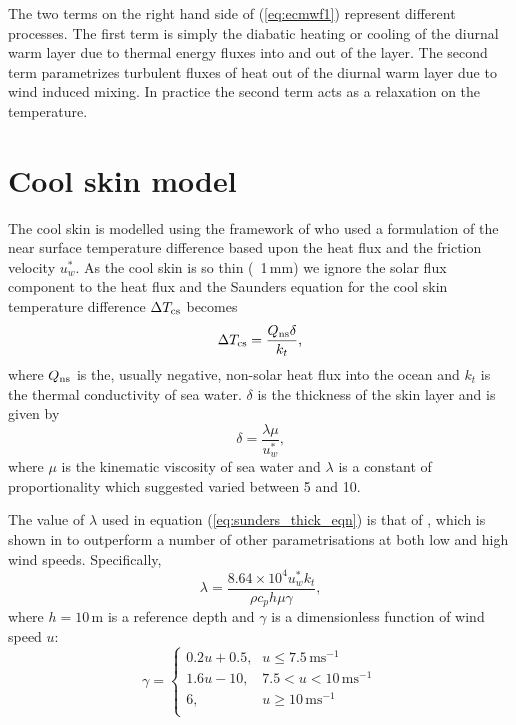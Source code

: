 \documentclass[../main/NEMO_manual]{subfiles}
\begin{document}
The two terms on the right hand side of (\autoref{eq:ecmwf1}) represent different processes.
The first term is simply the diabatic heating or cooling of the diurnal warm layer due to
thermal energy fluxes into and out of the layer.
The second term parametrizes turbulent fluxes of heat out of the diurnal warm layer due to wind induced mixing.
In practice the second term acts as a relaxation on the temperature.


\section{Cool skin model}
\label{sec:cool_skin_sec}


The cool skin is modelled using the framework of \citet{Saunders_JAS82} who used a formulation of the near surface temperature difference based upon the heat flux and the friction velocity $u^*_{w}$.
As the cool skin is so thin (~1\,mm) we ignore the solar flux component to the heat flux and the Saunders equation for the cool skin temperature difference $\Delta T_{\rm{cs}}$ becomes
\[
  \Delta T_{\rm{cs}}=\frac{Q_{\rm{ns}}\delta}{k_t} \mbox{,}
\]
where $Q_{\rm{ns}}$ is the, usually negative, non-solar heat flux into the ocean and
$k_t$ is the thermal conductivity of sea water.
$\delta$ is the thickness of the skin layer and is given by
\begin{equation}
\label{eq:sunders_thick_eqn}
\delta=\frac{\lambda \mu}{u^*_{w}} \mbox{,}
\end{equation}
where $\mu$ is the kinematic viscosity of sea water and $\lambda$ is a constant of proportionality which
\citet{Saunders_JAS82} suggested varied between 5 and 10.

The value of $\lambda$ used in equation (\autoref{eq:sunders_thick_eqn}) is that of \citet{Artale_al_JGR02},
which is shown in \citet{Tu_Tsuang_GRL05} to outperform a number of other parametrisations at
both low and high wind speeds.
Specifically,
\[
  \lambda = \frac{ 8.64\times10^4 u^*_{w} k_t }{ \rho c_p h \mu \gamma }\mbox{,}
\]
where $h=10$\,m is a reference depth and
$\gamma$ is a dimensionless function of wind speed $u$:
\[
  \gamma =
  \begin{cases}
    0.2u+0.5\mbox{,} & u \le 7.5\,\mbox{ms}^{-1} \\
    1.6u-10\mbox{,} & 7.5 < u < 10\,\mbox{ms}^{-1} \\
    6\mbox{,} & u \ge 10\,\mbox{ms}^{-1} \\
  \end{cases}
\]

\biblio

\pindex
\end{document}
